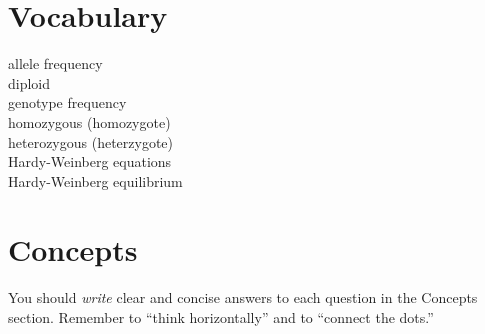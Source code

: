 \documentclass[letterpaper]{tufte-handout}
\begin{document}
\section*{Vocabulary}

\vspace{-1\baselineskip}
\begin{multicols}{2}
allele frequency \\
diploid\\
genotype frequency \\
homozygous (homozygote) \\
heterozygous (heterzygote) \\
Hardy-Weinberg equations \\
Hardy-Weinberg equilibrium
\end{multicols}

\section*{Concepts}

You should \emph{write} clear and concise answers to each question in the Concepts section.  Remember to ``think horizontally'' and to ``connect the dots.'' 
\end{document}
